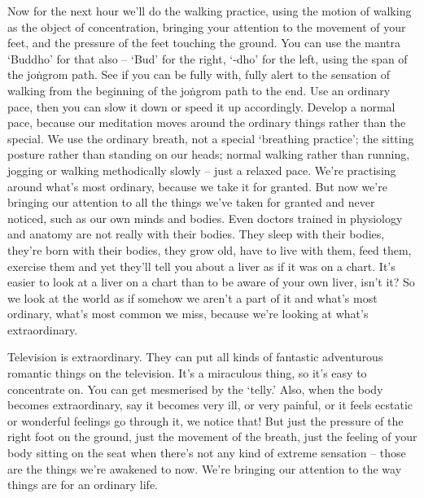
Now for the next hour we'll do the walking practice, using the motion of walking as the object of concentration, bringing your attention to the movement of your feet, and the pressure of the feet touching the ground. You can use the mantra `Buddho' for that also -- `Bud' for the right, `-dho' for the left, using the span of the joṅgrom path. See if you can be fully with, fully alert to the sensation of walking from the beginning of the joṅgrom path to the end. Use an ordinary pace, then you can slow it down or speed it up accordingly. Develop a normal pace, because our meditation moves around the ordinary things rather than the special. We use the ordinary breath, not a special `breathing practice'; the sitting posture rather than standing on our heads; normal walking rather than running, jogging or walking methodically slowly -- just a relaxed pace. We're practising around what's most ordinary, because we take it for granted. But now we're bringing our attention to all the things we've taken for granted and never noticed, such as our own minds and bodies. Even doctors trained in physiology and anatomy are not really with their bodies. They sleep with their bodies, they're born with their bodies, they grow old, have to live with them, feed them, exercise them and yet they'll tell you about a liver as if it was on a chart. It's easier to look at a liver on a chart than to be aware of your own liver, isn't it? So we look at the world as if somehow we aren't a part of it and what's most ordinary, what's most common we miss, because we're looking at what's extraordinary.

Television is extraordinary. They can put all kinds of fantastic adventurous romantic things on the television. It's a miraculous thing, so it's easy to concentrate on. You can get mesmerised by the `telly.' Also, when the body becomes extraordinary, say it becomes very ill, or very painful, or it feels ecstatic or wonderful feelings go through it, we notice that! But just the pressure of the right foot on the ground, just the movement of the breath, just the feeling of your body sitting on the seat when there's not any kind of extreme sensation -- those are the things we're awakened to now. We're bringing our attention to the way things are for an ordinary life.

